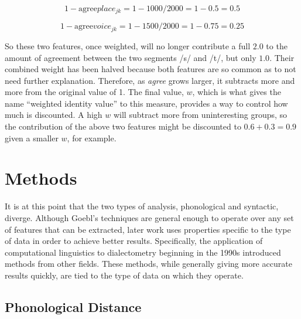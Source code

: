 \documentclass[11pt]{article}
\begin{document}
\begin{equation}
  1 - \textrm{agree}place_{jk} = 1 - 1000/2000 = 1 - 0.5 = 0.5
  \label{wiv-place}
  \end{equation}

\begin{equation}
  1 - \textrm{agree}voice_{jk} = 1 - 1500/2000 = 1 - 0.75 = 0.25
  \label{wiv-voice}
\end{equation}

So these two features, once weighted, will no longer contribute a full
$2.0$ to the amount of agreement between the two segments /s/ and /t/,
but only $1.0$. Their combined weight has been halved because both
features are so common as to not need further explanation.
Therefore, as \textit{agree} grows larger, it subtracts more and more
from the original value of 1.
The final value, $w$, which is what gives the name ``weighted identity
value'' to this measure, provides a way to control how much is
discounted. A high $w$ will subtract more from uninteresting groups,
so the contribution of the above two features might be discounted to
$0.6 + 0.3 = 0.9$ given a smaller $w$, for example.



\section{Methods}

It is at this point that the two types of analysis, phonological and
syntactic, diverge. Although Goebl's techniques are general enough to
operate over any set of features that can be extracted, later work
uses properties specific to the type of data in order to achieve
better results. Specifically, the application of computational
linguistics to dialectometry beginning in the 1990s introduced
methods from other fields. These methods, while generally giving more
accurate results quickly, are tied to the type of data on which they
operate.

\subsection{Phonological Distance}
\end{document}
